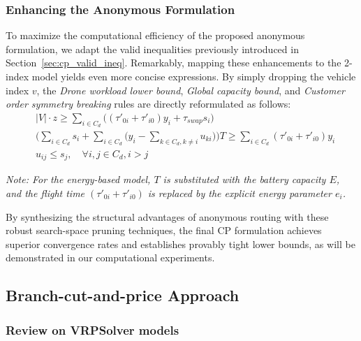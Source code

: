 \documentclass[3p, authoryear, 11pt]{elsarticle}
\begin{document}
\subsubsection{Enhancing the Anonymous Formulation}
\label{sec:cp_enhancing_anonymous}

To maximize the computational efficiency of the proposed anonymous formulation, we adapt the valid inequalities previously introduced in Section~\ref{sec:cp_valid_ineq}. Remarkably, mapping these enhancements to the 2-index model yields even more concise expressions. By simply dropping the vehicle index $v$, the \textit{Drone workload lower bound}, \textit{Global capacity bound}, and \textit{Customer order symmetry breaking} rules are directly reformulated as follows:
\begin{align}
    & |V| \cdot z \ge \sum_{i \in C_d} \Big( (\tau'_{0i} + \tau'_{i0}) y_{i} + \tau_{swap} s_{i} \Big) \\[4pt]
    & \Bigg( \sum_{i \in C_d} s_{i} + \sum_{i \in C_d} \Big(y_{i} - \sum_{k \in C_d, k \neq i} u_{ki} \Big) \Bigg) T \ge \sum_{i \in C_d} (\tau'_{0i} + \tau'_{i0}) y_{i} \\[4pt]
    & u_{ij} \le s_{j}, \quad \forall i, j \in C_d, i > j
\end{align}

\textit{Note: For the energy-based model, $T$ is substituted with the battery capacity $E$, and the flight time $(\tau'_{0i} + \tau'_{i0})$ is replaced by the explicit energy parameter $e_i$.}

By synthesizing the structural advantages of anonymous routing with these robust search-space pruning techniques, the final CP formulation achieves superior convergence rates and establishes provably tight lower bounds, as will be demonstrated in our computational experiments. 




\subsection{Branch-cut-and-price Approach}
\subsubsection{Review on VRPSolver models}
\end{document}
